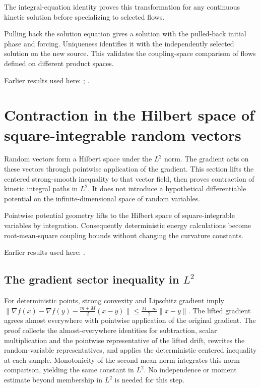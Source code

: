 \documentclass[11pt,a4paper]{report}
\begin{document}
The integral-equation identity proves this transformation for any continuous kinetic solution before specializing to selected flows.



Pulling back the solution equation gives a solution with the pulled-back initial phase and forcing. Uniqueness identifies it with the independently selected solution on the new source. This validates the coupling-space comparison of flows defined on different product spaces.



Earlier results used here: \cite[Section~3.13.2]{LangevinLean2026ULASC}; \cite[Section~3.13.5]{LangevinLean2026ULASC}.
\section{\texorpdfstring{Contraction in the Hilbert space of square-integrable random vectors}{Contraction in the Hilbert space of square-integrable random vectors}}
\label{proof-module-KineticLangevin-LpContraction-lean}


Random vectors form a Hilbert space under the \(L^{2}\) norm. The gradient acts on these vectors through pointwise application of the gradient. This section lifts the centered strong-smooth inequality to that vector field, then proves contraction of kinetic integral paths in \(L^{2}\). It does not introduce a hypothetical differentiable potential on the infinite-dimensional space of random variables.



Pointwise potential geometry lifts to the Hilbert space of square-integrable variables by integration. Consequently deterministic energy calculations become root-mean-square coupling bounds without changing the curvature constants.



Earlier results used here: \cite[Section~3.13]{LangevinLean2026ULASC}.
\subsection{\texorpdfstring{The gradient sector inequality in \(L^{2}\)}{The gradient sector inequality in L²}}
\label{report-step-KineticLangevin-LpContraction-lean-1}


For deterministic points, strong convexity and Lipschitz gradient imply \(\|\nabla f(x)-\nabla f(y)-\frac{m+M}{2}(x-y)\|\le\frac{M-m}{2}\|x-y\|\). The lifted gradient agrees almost everywhere with pointwise application of the original gradient. The proof collects the almost-everywhere identities for subtraction, scalar multiplication and the pointwise representative of the lifted drift, rewrites the random-variable representatives, and applies the deterministic centered inequality at each sample. Monotonicity of the second-mean norm integrates this norm comparison, yielding the same constant in \(L^{2}\). No independence or moment estimate beyond membership in \(L^{2}\) is needed for this step.
\end{document}
